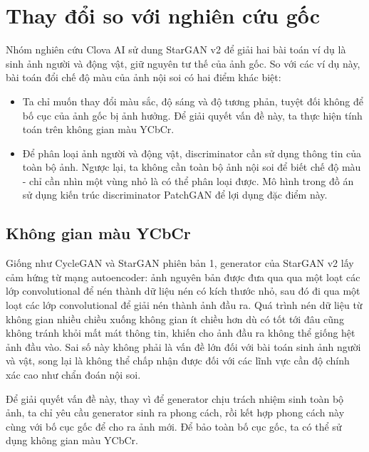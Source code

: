 \documentclass[12pt]{extreport}
\begin{document}
\section{Thay đổi so với nghiên cứu gốc}

Nhóm nghiên cứu Clova AI sử dung StarGAN v2 để giải hai bài toán ví dụ là sinh ảnh người và động vật, giữ nguyên tư thế của ảnh gốc. So với các ví dụ này, bài toán đổi chế độ màu của ảnh nội soi có hai điểm khác biệt:
\begin{itemize}
    \item Ta chỉ muốn thay đổi màu sắc, độ sáng và độ tương phản, tuyệt đối không để bố cục của ảnh gốc bị ảnh hưởng. Để giải quyết vấn đề này, ta thực hiện tính toán trên không gian màu YCbCr.
    \item Để phân loại ảnh người và động vật, discriminator cần sử dụng thông tin của toàn bộ ảnh. Ngược lại, ta không cần toàn bộ ảnh nội soi để biết chế độ màu - chỉ cần nhìn một vùng nhỏ là có thể phân loại được. Mô hình trong đồ án sử dụng kiến trúc discriminator PatchGAN để lợi dụng đặc điểm này.
\end{itemize}

\subsection{Không gian màu YCbCr}
\label{ycbcr-colorspace}

Giống như CycleGAN và StarGAN phiên bản 1, generator của StarGAN v2 lấy cảm hứng từ mạng autoencoder: ảnh nguyên bản được đưa qua qua một loạt các lớp convolutional để nén thành dữ liệu nén có kích thước nhỏ, sau đó đi qua một loạt các lớp convolutional để giải nén thành ảnh đầu ra. Quá trình nén dữ liệu từ không gian nhiều chiều xuống không gian ít chiều hơn dù có tốt tới đâu cũng không tránh khỏi mất mát thông tin, khiến cho ảnh đầu ra không thể giống hệt ảnh đầu vào. Sai số này không phải là vấn đề lớn đối với bài toán sinh ảnh người và vật, song lại là không thể chấp nhận được đối với các lĩnh vực cần độ chính xác cao như chẩn đoán nội soi.

Để giải quyết vấn đề này, thay vì để generator chịu trách nhiệm sinh toàn bộ ảnh, ta chỉ yêu cầu generator sinh ra phong cách, rồi kết hợp phong cách này cùng với bố cục gốc để cho ra ảnh mới. Để bảo toàn bố cục gốc, ta có thể sử dụng không gian màu YCbCr.
\end{document}
